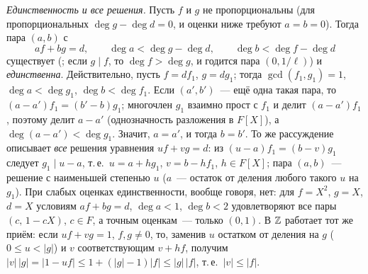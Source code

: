 \emph{Единственность и все решения.} Пусть $f$ и $g$ не пропорциональны (для пропорциональных $\deg g-\deg d=0$, и
оценки ниже требуют $a=b=0$). Тогда пара $(a,b)$ с
\[
af+bg=d,\qquad \deg a<\deg g-\deg d,\qquad \deg b<\deg f-\deg d
\]
существует (; если $g\mid f$, то $\deg f>\deg g$, и годится пара $(0,1/\ell)$) и \emph{единственна}. Действительно,
пусть $f=df_1$, $g=dg_1$; тогда $\gcd(f_1,g_1)=1$, $\deg a<\deg g_1$, $\deg b<\deg f_1$. Если $(a',b')$~--- ещё одна такая
пара, то $(a-a')f_1=(b'-b)g_1$; многочлен $g_1$ взаимно прост с $f_1$ и делит $(a-a')f_1$, поэтому делит $a-a'$
(однозначность разложения в $F[X]$), а $\deg(a-a')<\deg g_1$. Значит, $a=a'$, и тогда $b=b'$. То же рассуждение
описывает \emph{все} решения уравнения $uf+vg=d$: из $(u-a)f_1=(b-v)g_1$ следует $g_1\mid u-a$, т.\,е.\ $u=a+hg_1$,
$v=b-hf_1$, $h\in F[X]$; пара $(a,b)$~--- решение с наименьшей степенью $u$ ($a$~--- остаток от деления любого такого $u$ на
$g_1$). При слабых оценках
 единственности, вообще говоря, нет: для $f=X^2$, $g=X$, $d=X$ условиям $af+bg=d$, $\deg a<1$, $\deg b<2$
удовлетворяют все пары $(c,\,1-cX)$, $c\in F$, а точным оценкам~--- только $(0,1)$. В $\mathbb Z$ работает тот же приём: если
$uf+vg=1$, $f,g\ne0$, то, заменив $u$ остатком от деления на $g$ ($0\le u<|g|$) и $v$ соответствующим $v+hf$, получим
$|v|\,|g|=|1-uf|\le1+(|g|-1)|f|\le|g|\,|f|$, т.\,е.\ $|v|\le|f|$.

